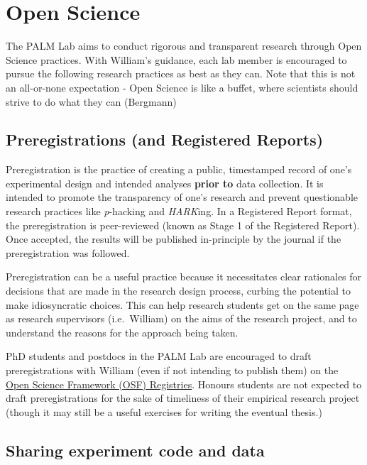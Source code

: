 \documentclass[
]{book}
\begin{document}
\hypertarget{open-science}{%
\section{Open Science}\label{open-science}}

The PALM Lab aims to conduct rigorous and transparent research through Open Science practices. With William's guidance, each lab member is encouraged to pursue the following research practices as best as they can. Note that this is not an all-or-none expectation - Open Science is like a buffet, where scientists should strive to do what they can (Bergmann)

\hypertarget{preregistrations-and-registered-reports}{%
\subsection{Preregistrations (and Registered Reports)}\label{preregistrations-and-registered-reports}}

Preregistration is the practice of creating a public, timestamped record of one's experimental design and intended analyses \textbf{prior to} data collection. It is intended to promote the transparency of one's research and prevent questionable research practices like \emph{p}-hacking and \emph{HARK}ing. In a Registered Report format, the preregistration is peer-reviewed (known as Stage 1 of the Registered Report). Once accepted, the results will be published in-principle by the journal if the preregistration was followed.

Preregistration can be a useful practice because it necessitates clear rationales for decisions that are made in the research design process, curbing the potential to make idiosyncratic choices. This can help research students get on the same page as research supervisors (i.e.~William) on the aims of the research project, and to understand the reasons for the approach being taken.

PhD students and postdocs in the PALM Lab are encouraged to draft preregistrations with William (even if not intending to publish them) on the \href{https://osf.io/registries/osf/new}{Open Science Framework (OSF) Registries}. Honours students are not expected to draft preregistrations for the sake of timeliness of their empirical research project (though it may still be a useful exercises for writing the eventual thesis.)

\hypertarget{sharing-experiment-code-and-data}{%
\subsection{Sharing experiment code and data}\label{sharing-experiment-code-and-data}}
\end{document}

